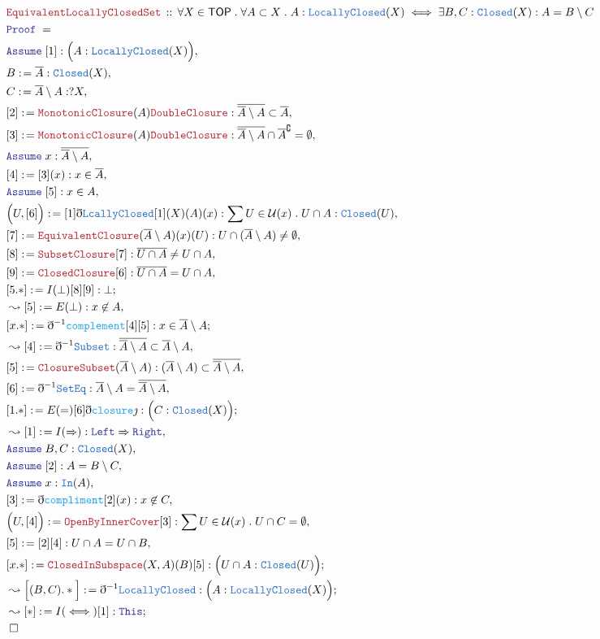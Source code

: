 \documentclass[12pt]{scrartcl}
\newcommand{\TYPE}[1]{\textcolor{NavyBlue}{\mathtt{#1}}}
\newcommand{\FUNC}[1]{\textcolor{Cerulean}{\mathtt{#1}}}
\newcommand{\LOGIC}[1]{\textcolor{Blue}{\mathtt{#1}}}
\newcommand{\THM}[1]{\textcolor{Maroon}{\mathtt{#1}}}
\renewcommand{\.}{\; . \;}
\newcommand{\de}{: \kern 0.1pc =}
\newcommand{\Theorem}[2]{& \THM{#1} \, :: \, #2 \\ & \Proof = \\ }
\newcommand{\Page}[1]{ \begin{align*} #1 \end{align*}   }
\newcommand{ \bd }{ \ByDef }
\newcommand{\Imply}{\Rightarrow}
\renewcommand{\c}{\complement}
\newcommand{\Say}[3]{& #1 \de #2 : #3, \\}
\newcommand{\Conclude}[3]{& #1 \de #2 : #3; \\}
\newcommand{\Derive}[3]{& \leadsto #1 \de #2 : #3, \\}
\newcommand{\DeriveConclude}[3]{& \leadsto #1 \de #2 : #3 ; \\}
\newcommand{\Assume}[2]{& \LOGIC{Assume} \; #1 : #2, \\}
\newcommand{\QED}{\; \square}
\newcommand{\EndProof}{& \QED \\}
\newcommand{\ByDef}{\eth}
\newcommand{\ByConstr}{\jmath}
\newcommand{\Proof}{\LOGIC{Proof} \; }
\newcommand{\TOP}{\mathsf{TOP}}
\renewcommand{\U}{\mathcal{U}}
\begin{document}
\Page{
	\Theorem{EquivalentLocallyClosedSet}
	{
		\forall X \in \TOP \. 
		\forall A \subset X \.
		A : \TYPE{LocallyClosed}(X) \iff
		\exists B,C : \TYPE{Closed}(X) :
		A = B \setminus C
	}
	\Assume{[1]}{\Big( A : \TYPE{LocallyClosed}(X) \Big)}
	\Say{B}{\overline{A}}{\TYPE{Closed}(X)}
	\Say{C}{\overline{A} \setminus A}{?X}
	\Say{[2]}{\THM{MonotonicClosure}(A)\THM{DoubleClosure}}{\overline{\overline{A} \setminus A} \subset \overline{A}}
	\Say{[3]}{\THM{MonotonicClosure}(A)\THM{DoubleClosure}}{\overline{\overline{A} \setminus A} \cap \overline{A}^\c = \emptyset}
	\Assume{x}{\overline{\overline{A} \setminus A}}
	\Say{[4]}{[3](x)}{x \in \overline{A}}
	\Assume{[5]}{x \in A}
	\Say{\Big( U, [6] \Big)}{[1]\bd \TYPE{LcallyClosed}[1](X)(A)(x)}
	{
		\sum U \in \U(x) \.  U \cap A : \TYPE{Closed}(U)
	}
	\Say{[7]}{\THM{EquivalentClosure}(\overline{A} \setminus A)(x)(U)}
	{
		U \cap (\overline{A} \setminus A) \neq \emptyset
	}
	\Say{[8]}{\THM{SubsetClosure}[7]}
	{
		\overline{U \cap A} \neq U \cap A
	}
	\Say{[9]}{\THM{ClosedClosure}[6]}{\overline{U \cap A} = U \cap A}
	\Conclude{[5.*]}{I(\bot)[8][9]}{\bot}
	\Derive{[5]}{E(\bot)}{x \not \in A}
	\Conclude{[x.*]}{\bd^{-1} \FUNC{complement}[4][5]}{x \in \overline{A} \setminus A}
	\Derive{[4]}{\bd^{-1} \TYPE{Subset}}{\overline{\overline{A} \setminus A} \subset \overline{A} \setminus A}
	\Say{[5]}{\THM{ClosureSubset}(\overline{A} \setminus A)}{ 
		(\overline{A} \setminus A) \subset 
		\overline{\overline{A} \setminus A}  
	}
	\Say{[6]}{\bd^{-1}\TYPE{SetEq}}{ \overline{A} \setminus A = \overline{\overline{A} \setminus A}  } 
	\Conclude{[1.*]}{E(=)[6]\bd \FUNC{closure}\ByConstr}{ \Big( C : \TYPE{Closed}(X) \Big)}
	\Derive{[1]}{I(\Imply)}{\LOGIC{Left} \Imply \LOGIC{Right}}
	\Assume{B,C}{\TYPE{Closed}(X)}
	\Assume{[2]}{A = B \setminus C}
	\Assume{x}{\TYPE{In}(A)}
	\Say{[3]}{\bd \FUNC{compliment}[2](x)}{ x \not \in C}
	\Say{\Big(U,[4]\Big)}{\THM{OpenByInnerCover}[3]}{\sum U \in \U(x) \. U \cap C = \emptyset}
	\Say{[5]}{[2][4]}{U \cap A = U \cap B}
	\Conclude{[x.*]}{\THM{ClosedInSubspace}(X,A)(B)[5]}{\Big( U \cap A : \TYPE{Closed}(U) \Big)}
	\DeriveConclude{\Big[(B,C).*\Big]}{\bd^{-1} \TYPE{LocallyClosed}}{\Big( A : \TYPE{LocallyClosed}(X)\Big)}
	\DeriveConclude{[*]}{I(\iff)[1]}{\LOGIC{This}}
	\EndProof
}
\newpage
\end{document}
